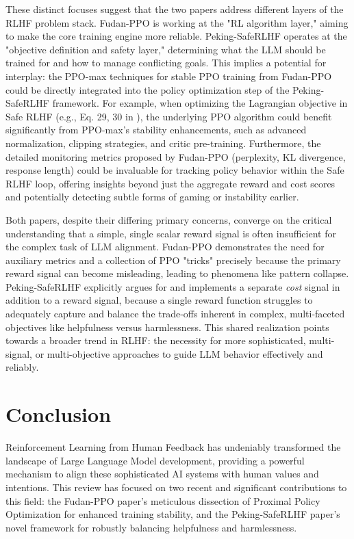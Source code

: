 \documentclass{article}
\begin{document}
These distinct focuses suggest that the two papers address different layers of the RLHF problem stack. Fudan-PPO is working at the "RL algorithm layer," aiming to make the core training engine more reliable. Peking-SafeRLHF operates at the "objective definition and safety layer," determining what the LLM should be trained for and how to manage conflicting goals. This implies a potential for interplay: the PPO-max techniques for stable PPO training from Fudan-PPO could be directly integrated into the policy optimization step of the Peking-SafeRLHF framework. For example, when optimizing the Lagrangian objective in Safe RLHF (e.g., Eq. 29, 30 in \cite{Dai2023SafeRLHF}), the underlying PPO algorithm could benefit significantly from PPO-max's stability enhancements, such as advanced normalization, clipping strategies, and critic pre-training. Furthermore, the detailed monitoring metrics proposed by Fudan-PPO (perplexity, KL divergence, response length) could be invaluable for tracking policy behavior within the Safe RLHF loop, offering insights beyond just the aggregate reward and cost scores and potentially detecting subtle forms of gaming or instability earlier.

Both papers, despite their differing primary concerns, converge on the critical understanding that a simple, single scalar reward signal is often insufficient for the complex task of LLM alignment. Fudan-PPO demonstrates the need for auxiliary metrics and a collection of PPO "tricks" precisely because the primary reward signal can become misleading, leading to phenomena like pattern collapse. Peking-SafeRLHF explicitly argues for and implements a separate \textit{cost} signal in addition to a reward signal, because a single reward function struggles to adequately capture and balance the trade-offs inherent in complex, multi-faceted objectives like helpfulness versus harmlessness. This shared realization points towards a broader trend in RLHF: the necessity for more sophisticated, multi-signal, or multi-objective approaches to guide LLM behavior effectively and reliably.

\section{Conclusion}
\label{sec:conclusion}

Reinforcement Learning from Human Feedback has undeniably transformed the landscape of Large Language Model development, providing a powerful mechanism to align these sophisticated AI systems with human values and intentions. This review has focused on two recent and significant contributions to this field: the Fudan-PPO paper's meticulous dissection of Proximal Policy Optimization for enhanced training stability, and the Peking-SafeRLHF paper's novel framework for robustly balancing helpfulness and harmlessness.  
\end{document}
